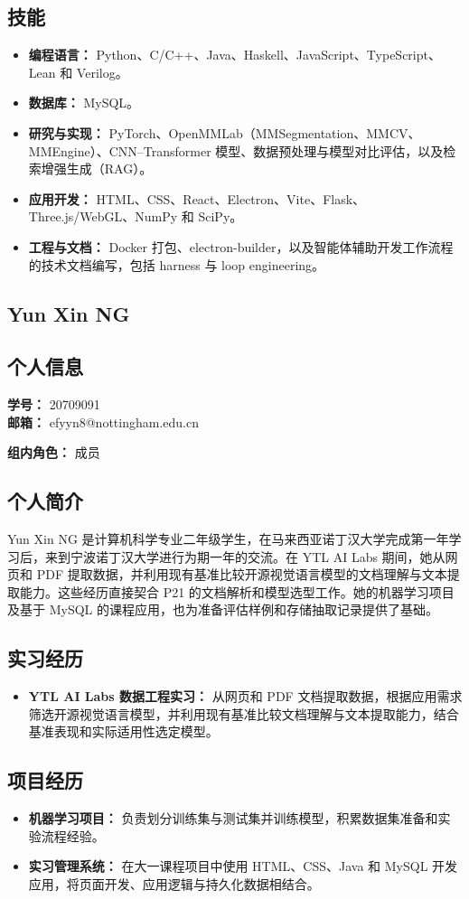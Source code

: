 \documentclass[a4paper,12pt]{article}
\newcommand{\PersonalInformation}[2]{%
  \subsection*{个人信息}
  \if\relax\detokenize{#1}\relax\else
  \noindent\textbf{学号：} #1\\
  \fi
  \textbf{邮箱：} #2\par
}
\begin{document}
\subsection*{技能}
\begin{itemize}
  \item \textbf{编程语言：} Python、C/C++、Java、Haskell、JavaScript、TypeScript、Lean 和 Verilog。
  \item \textbf{数据库：} MySQL。
  \item \textbf{研究与实现：} PyTorch、OpenMMLab（MMSegmentation、MMCV、MMEngine）、CNN--Transformer 模型、数据预处理与模型对比评估，以及检索增强生成（RAG）。
  \item \textbf{应用开发：} HTML、CSS、React、Electron、Vite、Flask、Three.js/WebGL、NumPy 和 SciPy。
  \item \textbf{工程与文档：} Docker 打包、electron-builder，以及智能体辅助开发工作流程的技术文档编写，包括 harness 与 loop engineering。
\end{itemize}

\subsection{Yun Xin NG}
\PersonalInformation{20709091}{efyyn8@nottingham.edu.cn}
\noindent\textbf{组内角色：} 成员\par

\subsection*{个人简介}
Yun Xin NG 是计算机科学专业二年级学生，在马来西亚诺丁汉大学完成第一年学习后，来到宁波诺丁汉大学进行为期一年的交流。在 YTL AI Labs 期间，她从网页和 PDF 提取数据，并利用现有基准比较开源视觉语言模型的文档理解与文本提取能力。这些经历直接契合 P21 的文档解析和模型选型工作。她的机器学习项目及基于 MySQL 的课程应用，也为准备评估样例和存储抽取记录提供了基础。

\subsection*{实习经历}
\begin{itemize}
  \item \textbf{YTL AI Labs 数据工程实习：} 从网页和 PDF 文档提取数据，根据应用需求筛选开源视觉语言模型，并利用现有基准比较文档理解与文本提取能力，结合基准表现和实际适用性选定模型。
\end{itemize}

\subsection*{项目经历}
\begin{itemize}
  \item \textbf{机器学习项目：} 负责划分训练集与测试集并训练模型，积累数据集准备和实验流程经验。
  \item \textbf{实习管理系统：} 在大一课程项目中使用 HTML、CSS、Java 和 MySQL 开发应用，将页面开发、应用逻辑与持久化数据相结合。
\end{itemize}
\end{document}
